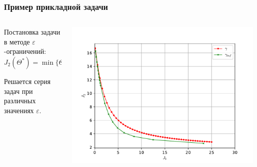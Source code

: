 \documentclass[aspectratio=1610]{beamer}
\begin{document}
\begin{frame}
  \frametitle{Пример прикладной задачи}
  \begin{columns}
    \begin{column}{0.5\textwidth}

      Постановка задачи в методе \(\varepsilon\)-ограничений:
      \begin{displaymath}
        J_2(\Theta^*)=\min\{\Theta: J_1(\Theta) < \varepsilon\}
      \end{displaymath}

      Решается серия задач при различных значениях \(\varepsilon\).

    \end{column}
    \begin{column}{0.5\textwidth}
      \centerline{\includegraphics[width=1.2\textwidth]{solution.pdf}}
    \end{column}
  \end{columns}

\end{frame}
\end{document}
